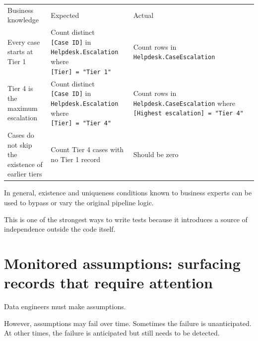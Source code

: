\documentclass[10pt,openany,10pt]{book}
\newcounter{none}
\let\podeToprule\toprule
\let\podeMidrule\midrule
\let\podeBottomrule\bottomrule
\renewcommand{\toprule}{\arrayrulecolor{pbiGrid}\podeToprule}
\renewcommand{\midrule}{\arrayrulecolor{pbiGrid}\podeMidrule}
\renewcommand{\bottomrule}{\arrayrulecolor{pbiGrid}\podeBottomrule}
\begin{document}
{\def\LTcaptype{none} %
\begin{longtable}[]{@{}
  >{\raggedright\arraybackslash}p{}
  >{\raggedright\arraybackslash}p{}
  >{\raggedright\arraybackslash}p{}@{}}
\toprule\noalign{}
\begin{minipage}[b]{\linewidth}\raggedright
Business knowledge
\end{minipage} & \begin{minipage}[b]{\linewidth}\raggedright
Expected
\end{minipage} & \begin{minipage}[b]{\linewidth}\raggedright
Actual
\end{minipage} \\
\midrule\noalign{}
\endhead
\bottomrule\noalign{}
\endlastfoot
Every case starts at Tier 1 & Count distinct \texttt{{[}Case\ ID{]}} in
\texttt{Helpdesk.Escalation} where \texttt{{[}Tier{]}\ =\ "Tier\ 1"} &
Count rows in \texttt{Helpdesk.CaseEscalation} \\
Tier 4 is the maximum escalation & Count distinct
\texttt{{[}Case\ ID{]}} in \texttt{Helpdesk.Escalation} where
\texttt{{[}Tier{]}\ =\ "Tier\ 4"} & Count rows in
\texttt{Helpdesk.CaseEscalation} where
\texttt{{[}Highest\ escalation{]}\ =\ "Tier\ 4"} \\
Cases do not skip the existence of earlier tiers & Count Tier 4 cases
with no Tier 1 record & Should be zero \\
\end{longtable}
}

In general, existence and uniqueness conditions known to business
experts can be used to bypass or vary the original pipeline logic.

This is one of the strongest ways to write tests because it introduces a
source of independence outside the code itself.

\section{Monitored assumptions: surfacing records that require
attention}\label{monitored-assumptions-surfacing-records-that-require-attention}

Data engineers must make assumptions.

However, assumptions may fail over time. Sometimes the failure is
unanticipated. At other times, the failure is anticipated but still
needs to be detected.
\end{document}
